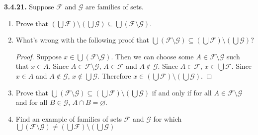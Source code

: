 \documentclass[12pt]{amsart}
\newenvironment{statement}[1]{\smallskip\noindent\color[rgb]{.6627, .3529, .6314} {\bf #1.}}{}
\theoremstyle{definition}
\theoremstyle{remark}
\begin{document}
\begin{statement}{3.4.21}
Suppose $\mathcal{F}$ and $\mathcal{G}$ are families of sets.
\begin{enumerate}
	\item Prove that $\left( \bigcup \mathcal{F} \right) \setminus \left( \bigcup \mathcal{G} \right)
	\subseteq \bigcup (\mathcal{F} \setminus \mathcal{G})$.
	
	\item What's wrong with the following proof that $\bigcup (\mathcal{F} \setminus \mathcal{G})
	\subseteq \left( \bigcup \mathcal{F} \right) \setminus \left( \bigcup \mathcal{G} \right)$?
	\begin{proof}
		Suppose $x \in \bigcup (\mathcal{F} \setminus \mathcal{G})$.
		Then we can choose some $A \in \mathcal{F} \setminus \mathcal{G}$ such that $x \in A$.
		Since $A \in \mathcal{F} \setminus \mathcal{G}$, 
		$A \in \mathcal{F}$ and $A \notin \mathcal{G}$.
		Since $A \in \mathcal{F}$, $x \in \bigcup \mathcal{F}$.
		Since $x \in A$ and $A \notin \mathcal{G}$, $x \notin \bigcup \mathcal{G}$.
		Therefore $x \in \left( \bigcup \mathcal{F} \right) \setminus
		\left( \bigcup \mathcal{G} \right)$.
	\end{proof}
	
	\item Prove that $\bigcup (\mathcal{F} \setminus \mathcal{G})
	\subseteq \left( \bigcup \mathcal{F} \right) \setminus \left( \bigcup \mathcal{G} \right)$
	if and only if for all $A \in \mathcal{F} \setminus \mathcal{G}$ and for all $B \in \mathcal{G}$,
	$A \cap B = \varnothing$.
	
	\item Find an example of families of sets $\mathcal{F}$ and $\mathcal{G}$ for which
	$\bigcup (\mathcal{F} \setminus \mathcal{G})
	\neq \left( \bigcup \mathcal{F} \right) \setminus \left( \bigcup \mathcal{G} \right)$
\end{enumerate}
\end{statement}
\end{document}
